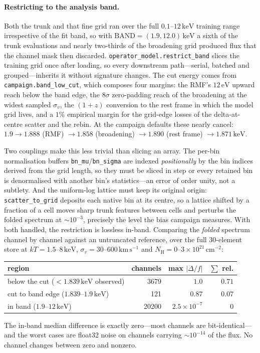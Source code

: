 \documentclass[11pt,a4paper]{article}
\newcommand{\nh}{N_{\mathrm{H}}}
\newcommand{\kev}{\,\mathrm{keV}}
\newcommand{\kms}{\,\mathrm{km\,s^{-1}}}
\newcommand{\code}[1]{\texttt{#1}}
\begin{document}
\paragraph{Restricting to the analysis band.} Both the trunk and that fine grid
ran over the full $0.1$--$12\kev$ training range irrespective of the fit band,
so with $\mathrm{BAND}=(1.9,12.0)\kev$ a sixth of the trunk evaluations and
nearly two-thirds of the broadening grid produced flux that the channel mask
then discarded. \code{operator\_model.restrict\_band} slices the training grid
once after loading, so every downstream path---serial, batched and
grouped---inherits it without signature changes. The cut energy comes from
\code{campaign.band\_low\_cut}, which composes four margins: the RMF's
$12\,\mathrm{eV}$ upward reach below the band edge, the $8\sigma$ zero-padding reach of
the broadening at the widest sampled $\sigma_v$, the $(1+z)$ conversion to the
rest frame in which the model grid lives, and a $1\%$ empirical margin for the
grid-edge losses of the delta-at-centre scatter and the rebin. At the campaign
defaults these nearly cancel: $1.9 \to 1.888$ (RMF) $\to 1.858$ (broadening)
$\to 1.890$ (rest frame) $\to 1.871\kev$.

Two couplings make this less trivial than slicing an array. The per-bin
normalisation buffers \code{bn\_mu}/\code{bn\_sigma} are indexed
\emph{positionally} by the bin indices derived from the grid length, so they
must be sliced in step or every retained bin is denormalised with another bin's
statistics---an error of order unity, not a subtlety. And the uniform-log
lattice must keep its original origin: \code{scatter\_to\_grid} deposits each
native bin at its centre, so a lattice shifted by a fraction of a cell moves
sharp trunk features between cells and perturbs the folded spectrum at
${\sim}10^{-3}$, precisely the level the bias campaign measures. With both
handled, the restriction is lossless in-band. Comparing the \emph{folded}
spectrum channel by channel against an untruncated reference, over the full
30-element store at $kT=1.5$--$8\kev$, $\sigma_v=30$--$600\kms$ and
$\nh=0$--$3\times10^{21}\,\mathrm{cm^{-2}}$:
\begin{center}
\begin{tabular}{lrrr}
\toprule
region & channels & max $|\Delta/f|$ & $\sum$ rel. \\
\midrule
below the cut ($<1.839\kev$ observed) & 3679 & $1.0$ & $0.71$ \\
cut to band edge ($1.839$--$1.9\kev$) & 121 & $0.87$ & $0.07$ \\
in band ($1.9$--$12\kev$) & 20200 & $2.5\times10^{-7}$ & $0$ \\
\bottomrule
\end{tabular}
\end{center}
The in-band median difference is exactly zero---most channels are
bit-identical---and the worst cases are float32 noise on channels carrying
${\sim}10^{-14}$ of the flux. No channel changes between zero and nonzero.
\end{document}
